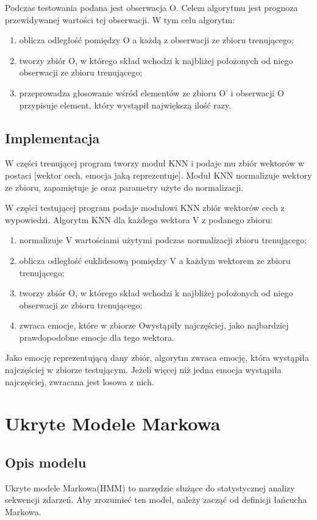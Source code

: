 \documentclass[declaration,shortabstract]{iithesis}
\begin{document}
Podczas testowania podana jest obserwacja O. Celem algorytmu jest prognoza przewidywanej wartości tej obserwacji. W tym celu algorytm:
\begin{enumerate}
\item oblicza odległość pomiędzy O a każdą z obserwacji ze zbioru trenującego;
\item tworzy zbiór O\textprime, w którego skład wchodzi k najbliżej położonych od niego obserwacji ze zbioru trenującego;
\item przeprowadza głosowanie wśród elementów ze zbioru O’ i obserwacji O przypisuje element, który wystąpił największą ilość razy.
\end{enumerate}

\section{Implementacja}
W części trenującej program tworzy moduł KNN i podaje mu zbiór wektorów w postaci [wektor cech, emocja jaką reprezentuje]. Moduł KNN normalizuje wektory ze zbioru, zapamiętuje je oraz parametry użyte do normalizacji.

W części testującej program podaje modułowi KNN zbiór wektorów cech z wypowiedzi. Algorytm KNN dla każdego wektora V z podanego zbioru:
\begin{enumerate}
\item normalizuje V wartościami użytymi podczas normalizacji zbioru trenującego;
\item oblicza odległość euklidesową pomiędzy V a każdym wektorem ze zbioru trenującego;
\item tworzy zbiór O\textprime, w którego skład wchodzi k najbliżej położonych od niego obserwacji ze zbioru trenującego;
\item zwraca emocje, które w zbiorze O\textprime wystąpiły najczęściej, jako najbardziej prawdopodobne emocje dla tego wektora.
\end{enumerate}
Jako emocję reprezentującą dany zbiór, algorytm zwraca emocję, która wystąpiła najczęściej w zbiorze testującym. Jeżeli więcej niż jedna emocja wystąpiła najczęściej, zwracana jest losowa z nich. 

\chapter{Ukryte Modele Markowa}
\section{Opis modelu}
Ukryte modele Markowa(HMM) to narzędzie służące do statystycznej analizy sekwencji zdarzeń. Aby zrozumieć ten model, należy zacząć od 
definicji łańcucha Markowa.
\end{document}
